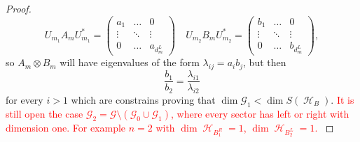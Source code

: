 \documentclass[11pt]{article}
\theoremstyle{newdefinition}
\theoremstyle{newplain}
\theoremstyle{myplain}
\DeclareMathOperator{\HH}{\mathcal{H}}
\DeclareMathOperator{\1}{\mathds{1}}
\begin{document}
\begin{proof}
\begin{equation}
    U_{m_1} A_m U_{m_1}^*=\begin{pmatrix}
        a_1 & \hdots &0\\
        \vdots& \ddots&\vdots\\
        0 & \hdots & a_{d_m^L}
    \end{pmatrix} \quad  U_{m_2} B_m U_{m_2}^*=\begin{pmatrix}
        b_1 & \hdots &0\\
        \vdots& \ddots&\vdots\\
        0 & \hdots & b_{d_m^L}
    \end{pmatrix},
\end{equation}
so $A_m\otimes B_m$ will have eigenvalues of the form $\lambda_{ij}=a_i b_j$, but then
\begin{equation}
    \frac{b_1}{b_2}=\frac{\lambda_{i1}}{\lambda_{i2}}
\end{equation}
for every $i>1$ which are constrains proving that $\dim \mathcal{G}_1 < \dim S(\HH_B)$. 
\textcolor{red}{It is still open the case  $\mathcal{G}_2=\mathcal{G}\setminus(\mathcal{G}_0\cup \mathcal{G}_1)$, where every sector has left or right with dimension one. For example $n=2$ with $\dim \HH_{B_1^R}=1$,  $\dim \HH_{B_2^L}=1$. }
\end{proof}

\begin{comment}
 \textcolor{red}{
 Now, the manifold $T_{AC}(BSRS)$ has the same dimension that the sphere of positive semidefinte matrices
    \begin{equation}
       \mathbb{S}_B^+=\{ S \in B(\HH_B) : \Vert S \Vert_2=1\}\cap L(\HH_B)_+,
    \end{equation}
    and by previous theorem $T_{AC}(QMC)$ has the same dimension that  $G=\cup_N G_N$ where
    \begin{equation}
        G_N=\left\{ S \in  \mathbb{S}_B^+: S=\bigoplus_{n=1}^N S_{b_n^L}\otimes  S_{b_n^L}, \text{ for some decomposition} \HH_B\simeq \bigoplus_{n=1}^N \HH_{b_n^L}\otimes  \HH_{b_n^L} \right\}
    \end{equation}
    We consider two cases: if $N>1$, the manifold of positive semidefinite block diagonal matrices in the sphere has strict lower dimension (as manifold dimension) than
       $\mathbb{S}_B^+$ so it has zero measure. For $N=1$ if we denote $\hat{d}_L=\frac{1}{2}d_L(d_L+1)$, $\hat{d}_R=\frac{1}{2}d_R(d_R+1)$ (and  assuming $d_L,d_R\geq 2$), the submanifold
    \begin{equation}
        \mathbb{P}_B=\{S \in \mathbb{S}_B : S=S_{B^L}\otimes S_{B^R}\}\cap L(\HH_B)_+,
    \end{equation}
    has dimension (as manifold) at most $\hat{d}_L^2+\hat{d}_R^2$ , which is lower than the dimensions of $\mathbb{S}_B^+$ equal to $(\hat{d}_L\hat{d}_R)^2-1$, and the same conclusion follows.}
\end{comment}
\end{document}
